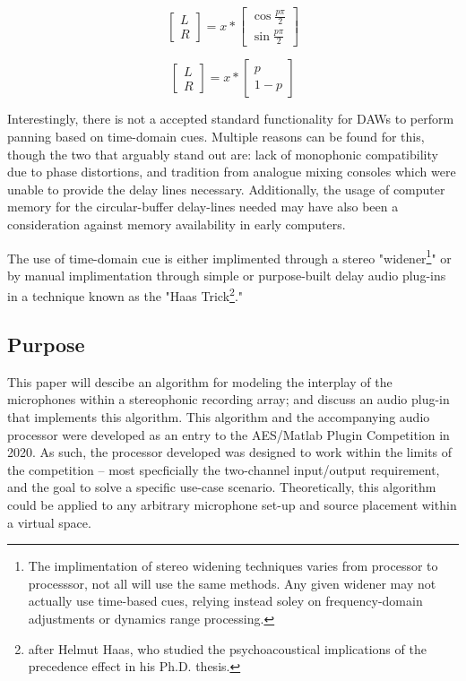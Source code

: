 \begin{equation} \label{threedB}
	\begin{bmatrix}L \\  R \end{bmatrix} = x * \begin{bmatrix} \cos{\frac{p\pi}{2}} \\ \sin{\frac{p\pi}{2}} \end{bmatrix}
\end{equation}

\begin{equation}\label{sixdB}
	\begin{bmatrix}L \\  R \end{bmatrix} = x * \begin{bmatrix} p \\ 1 - p \end{bmatrix}
\end{equation}

Interestingly, there is not a accepted standard functionality for DAWs to perform panning based on time-domain cues. Multiple reasons can be found for this, though the two that arguably stand out are: lack of monophonic compatibility due to phase distortions, and tradition from analogue mixing consoles which were unable to provide the delay lines necessary. Additionally, the usage of computer memory for the circular-buffer delay-lines needed may have also been a consideration against memory availability in early computers.

The use of time-domain cue is either implimented through a stereo "widener\footnote{The implimentation of stereo widening techniques varies from processor to processsor, not all will use the same methods. Any given widener may not actually use time-based cues, relying instead soley on frequency-domain adjustments or dynamics range processing.}" or by manual implimentation through simple or purpose-built delay audio plug-ins in a technique known as the "Haas Trick\footnote{after Helmut Haas, who studied the psychoacoustical implications of the precedence effect in his Ph.D. thesis.}."

\subsection{Purpose}

This paper will descibe an algorithm for modeling the interplay of the microphones within a stereophonic recording array; and discuss an audio plug-in that implements this algorithm. This algorithm and the accompanying audio processor were developed as an entry to the AES/Matlab Plugin Competition in 2020. As such, the processor developed was designed to work within the limits of the competition -- most specficially the two-channel input/output requirement, and the goal to solve a specific use-case scenario. Theoretically, this algorithm could be applied to any arbitrary microphone set-up and source placement within a virtual space.

